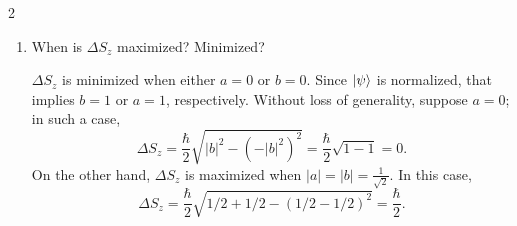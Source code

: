 \documentclass[11pt]{article}
\begin{document}
\begin{problem}{2}
\begin{enumerate}[label=(\alph*)]
\begin{proof}
            Plugging \( a \) and \( b \) into \cref{eq:9,eq:10} gives
            \begin{equation}
            \label{eq:11}
            \begin{aligned}
              \langle S_z \rangle &= \frac{\hbar}{2}(\frac{4}{5} - \frac{1}{\sqrt{5}}) = \frac{3}{5} \frac{\hbar}{2}, \\
              \Delta S_z &= \frac{\hbar}{2} \sqrt{1 - (3/5)^2} = \frac{\hbar}{2} \sqrt{\frac{16}{25}} = \frac{4}{5} \frac{\hbar}{2},
            \end{aligned}
          \end{equation}
          which agree, as they must.
          \end{proof}
          \item When is \(\Delta S_z\) maximized? Minimized?
          \begin{answer}
            \(\Delta S_z\) is minimized when either \( a = 0 \) or \( b = 0 \).
            Since \( \ket{\psi} \) is normalized, that implies \( b = 1 \) or \( a = 1 \), respectively.
            Without loss of generality, suppose \( a = 0 \); in such a case,
            \begin{equation}
            \label{eq:12}
            \Delta S_z = \frac{\hbar}{2} \sqrt{|b|^2 - (-|b|^2)^2} = \frac{\hbar}{2} \sqrt{1 - 1} = 0.
          \end{equation}
          On the other hand, \(\Delta S_z\) is maximized when \( |a| = |b| = \frac{1}{\sqrt{2}} \).
          In this case,
          \begin{equation}
          \label{eq:13}
          \Delta S_z = \frac{\hbar}{2} \sqrt{1/2 + 1/2 - (1/2 - 1/2)^2} = \frac{\hbar}{2}.
          \end{equation}
          \end{answer}
  \end{enumerate}
\end{problem}
\end{document}

